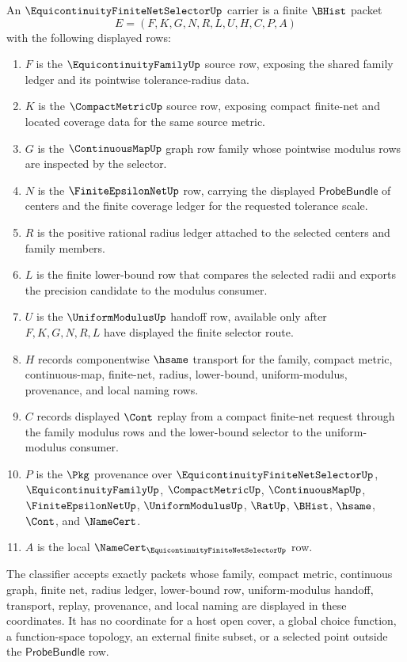 \begin{definition}
\label{def:equicontinuity-finite-net-selector-carrier}
An $\EquicontinuityFiniteNetSelectorUp$ carrier is a finite $\BHist$ packet
$$
E=(F,K,G,N,R,L,U,H,C,P,A)
$$
with the following displayed rows:
\begin{enumerate}
\item $F$ is the $\EquicontinuityFamilyUp$ source row, exposing the shared family ledger and its pointwise tolerance-radius data.
\item $K$ is the $\CompactMetricUp$ source row, exposing compact finite-net and located coverage data for the same source metric.
\item $G$ is the $\ContinuousMapUp$ graph row family whose pointwise modulus rows are inspected by the selector.
\item $N$ is the $\FiniteEpsilonNetUp$ row, carrying the displayed $\mathsf{ProbeBundle}$ of centers and the finite coverage ledger for the requested tolerance scale.
\item $R$ is the positive rational radius ledger attached to the selected centers and family members.
\item $L$ is the finite lower-bound row that compares the selected radii and exports the precision candidate to the modulus consumer.
\item $U$ is the $\UniformModulusUp$ handoff row, available only after $F,K,G,N,R,L$ have displayed the finite selector route.
\item $H$ records componentwise $\hsame$ transport for the family, compact metric, continuous-map, finite-net, radius, lower-bound, uniform-modulus, provenance, and local naming rows.
\item $C$ records displayed $\Cont$ replay from a compact finite-net request through the family modulus rows and the lower-bound selector to the uniform-modulus consumer.
\item $P$ is the $\Pkg$ provenance over $\EquicontinuityFiniteNetSelectorUp$, $\EquicontinuityFamilyUp$, $\CompactMetricUp$, $\ContinuousMapUp$, $\FiniteEpsilonNetUp$, $\UniformModulusUp$, $\RatUp$, $\BHist$, $\hsame$, $\Cont$, and $\NameCert$.
\item $A$ is the local $\NameCert_{\EquicontinuityFiniteNetSelectorUp}$ row.
\end{enumerate}
The classifier accepts exactly packets whose family, compact metric, continuous graph, finite net, radius ledger, lower-bound row, uniform-modulus handoff, transport, replay, provenance, and local naming are displayed in these coordinates. It has no coordinate for a host open cover, a global choice function, a function-space topology, an external finite subset, or a selected point outside the $\mathsf{ProbeBundle}$ row.
\end{definition}

